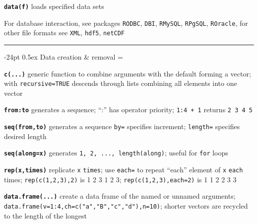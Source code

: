 \documentclass[8pt,landscape]{article}
\makeatletter
\renewcommand\section{\@startsection{section}{1}{0mm}%
                                     {-24pt}%
                                     {0.5ex}%
                                {\color{blue}\normalfont\large\bfseries}}
\newcommand{\code}{\texttt}
\newcommand{\bcode}[1]{\texttt{\textbf{#1}}}
\makeatother
\begin{document}
\begin{multicols*}{3}
\bcode{data(f)} loads specified data sets

                 


% 

\bigskip

For database interaction, see packages \code{RODBC}, \code{DBI},
\code{RMySQL}, \code{RPgSQL}, \code{ROracle}, for other file formats see
\code{XML}, \code{hdf5}, \code{netCDF} 



\rule{.3\textwidth}{0.4pt}


\section{Data creation \& removal}
\everypar={\hangindent=9mm}


\bcode{c(...)} generic function to combine arguments with the default
forming a vector;
with \code{recursive=TRUE} descends through lists combining all elements
into one vector

\bcode{from:to} generates a sequence; ``:'' has operator priority; \code{1:4
+ 1} returns \code{2 3 4 5}

\bcode{seq(from,to)} generates a sequence
\code{by=} specifies increment; \code{length=} specifies desired length

\bcode{seq(along=x)} generates \code{1, 2, ..., length(along)}; useful for
\code{for} loops

\bcode{rep(x,times)} replicate \code{x} \code{times}; use \code{each=}
to repeat ``each'' element of \code{x} \code{each} times;
\code{rep(c(1,2,3),2)} is 1 2 3 1 2 3; \code{rep(c(1,2,3),each=2)} is 1 1 2 2 3 3 

\bcode{data.frame(...)} create a data frame of the named or unnamed arguments;
  \code{data.frame(v=1:4,ch=c("a","B","c","d"),n=10)}; shorter vectors
  are recycled to the length of the longest 


\end{multicols*}
\end{document}
